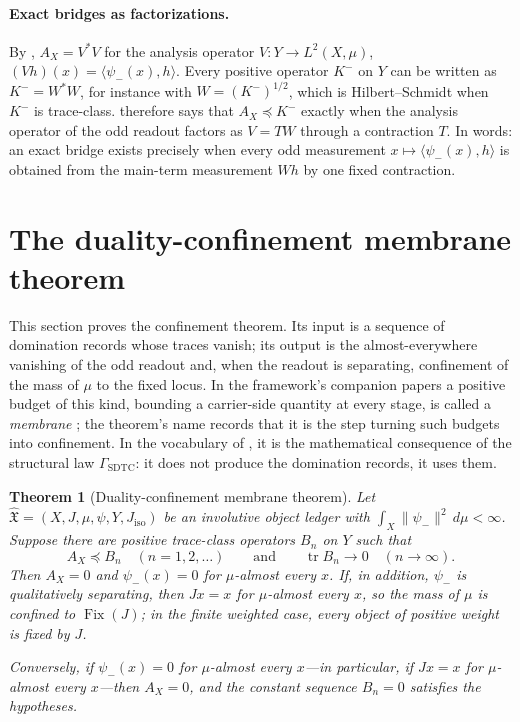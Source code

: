 \documentclass[11pt]{article}
\DeclareMathOperator{\Fix}{Fix}
\DeclareMathOperator{\trace}{tr}
\newcommand{\psim}{\psi_{-}}
\newcommand{\AX}{A_{X}}
\newcommand{\Kminus}{K^{-}}
\newcommand{\Jiso}{J_{\mathrm{iso}}}
\newcommand{\IOL}{\hat{\mathfrak{X}}}
\newcommand{\GamSDTC}{\Gamma_{\mathrm{SDTC}}}
\newtheorem{theorem}{Theorem}[section]
\theoremstyle{definition}
\begin{document}
\paragraph{Exact bridges as factorizations.}
By ,
\(\AX=V^*V\) for the analysis operator
\(V:Y\to L^2(X,\mu)\), \((Vh)(x)=\langle\psim(x),h\rangle\).  Every
positive operator \(\Kminus\) on \(Y\) can be written as
\(\Kminus=W^*W\), for instance with \(W=(\Kminus)^{1/2}\), which is
Hilbert--Schmidt when \(\Kminus\) is trace-class.
 therefore says that
\(\AX\preceq\Kminus\) exactly when the analysis operator of the odd
readout factors as \(V=TW\) through a contraction \(T\).  In words: an
exact bridge exists precisely when every odd measurement
\(x\mapsto\langle\psim(x),h\rangle\) is obtained from the main-term
measurement \(Wh\) by one fixed contraction.
 \section{The duality-confinement membrane theorem}
\label{sec:master_theorem}

This section proves the confinement theorem.  Its input is a sequence
of domination records whose traces vanish; its output is the
almost-everywhere vanishing of the odd readout and, when the readout is
separating, confinement of the mass of \(\mu\) to the fixed locus.  In the
framework's companion papers a positive budget of this kind, bounding
a carrier-side quantity at every stage, is called a \emph{membrane}
\citep{TsiokosNeedleKiller2026}; the theorem's name records that it is
the step turning such budgets into confinement.  In the vocabulary of
, it is the mathematical consequence of the
structural law \(\GamSDTC\): it does not produce the domination
records, it uses them.

\begin{theorem}[Duality-confinement membrane theorem]
\label{thm:duality_confinement:master-theorem}
Let \(\IOL=(X,J,\mu,\psi,Y,\Jiso)\) be an involutive object ledger with
\(\int_X\|\psim\|^2\,d\mu<\infty\).  Suppose there are positive
trace-class operators \(B_n\) on \(Y\) such that
\[
  \AX\preceq B_n\quad(n=1,2,\ldots)
  \qquad\text{and}\qquad
  \trace B_n\to0\quad(n\to\infty).
\]
Then \(\AX=0\) and \(\psim(x)=0\) for \(\mu\)-almost every \(x\).  If,
in addition, \(\psim\) is qualitatively separating, then \(Jx=x\) for
\(\mu\)-almost every \(x\), so the mass of \(\mu\) is confined to
\(\Fix(J)\); in the finite weighted case, every object of positive
weight is fixed by \(J\).

Conversely, if \(\psim(x)=0\) for \(\mu\)-almost every \(x\)---in
particular, if \(Jx=x\) for \(\mu\)-almost every \(x\)---then
\(\AX=0\), and the constant sequence \(B_n=0\) satisfies the
hypotheses.
\end{theorem}
\end{document}
